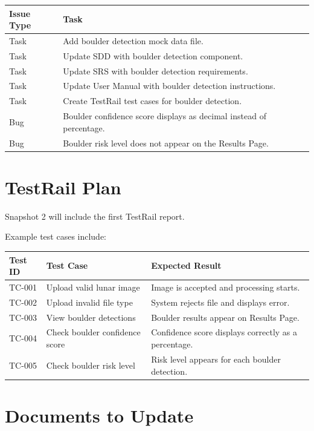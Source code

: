 \documentclass[12pt]{article}
\begin{document}
\begin{longtable}{|p{1.5in}|p{4.5in}|}
\hline
\textbf{Issue Type} & \textbf{Task} \\
\hline
Task & Add boulder detection mock data file. \\
\hline
Task & Update SDD with boulder detection component. \\
\hline
Task & Update SRS with boulder detection requirements. \\
\hline
Task & Update User Manual with boulder detection instructions. \\
\hline
Task & Create TestRail test cases for boulder detection. \\
\hline
Bug & Boulder confidence score displays as decimal instead of percentage. \\
\hline
Bug & Boulder risk level does not appear on the Results Page. \\
\hline
\end{longtable}

\section{TestRail Plan}

Snapshot 2 will include the first TestRail report.

Example test cases include:

\begin{longtable}{|p{1.2in}|p{2.4in}|p{2.4in}|}
\hline
\textbf{Test ID} & \textbf{Test Case} & \textbf{Expected Result} \\
\hline
TC-001 & Upload valid lunar image & Image is accepted and processing starts. \\
\hline
TC-002 & Upload invalid file type & System rejects file and displays error. \\
\hline
TC-003 & View boulder detections & Boulder results appear on Results Page. \\
\hline
TC-004 & Check boulder confidence score & Confidence score displays correctly as a percentage. \\
\hline
TC-005 & Check boulder risk level & Risk level appears for each boulder detection. \\
\hline
\end{longtable}

\section{Documents to Update}
\end{document}
